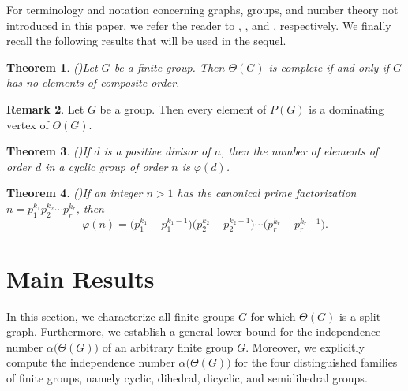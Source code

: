 \documentclass{amsart}
\theoremstyle{plain}
\newtheorem{theorem}{Theorem}[section]
\theoremstyle{definition}
\newtheorem{remark}[theorem]{Remark}
\begin{document}
\vspace{0.5mm}
For terminology and notation concerning graphs, groups, and number theory not introduced in this paper, we refer the reader to \cite{west-b01}, \cite{gallian-b21}, and \cite{burton-b07}, respectively. We finally recall the following results that will be used in the sequel.

\begin{theorem}(\cite[Theorem~3.5]{adhikari-nsjom22})\label{th_thetaG-complete-iff-G-no-compo-order}
Let $G$ be a finite group. Then $\Theta(G)$ is complete if and only if $G$ has no elements of composite order.
\end{theorem}

\begin{remark}\cite[Theorem~3.1(b)]{adhikari-nsjom22}\label{re_dominating-vertex}
Let $G$ be a group. Then every element of $P(G)$ is a dominating vertex of $\Theta(G)$.
\end{remark}

\begin{theorem}(\cite[Theorem~4.4]{gallian-b21})\label{th_phi-d-elems-in-Zn}
If $d$ is a positive divisor of $n$, then the number of elements of order $d$ in a cyclic group of order $n$ is $\varphi(d)$.
\end{theorem}

\begin{theorem}(\cite[Theorem~7.3]{burton-b07})\label{th_value-of-phi-n}
If an integer $n>1$ has the canonical prime factorization $n = p_1^{k_1} p_2^{k_2} \cdots p_r^{k_r}$, then 
\[\varphi(n) = \bigl(p_1^{k_1}-p_1^{k_1-1} \bigr) \bigl(p_2^{k_2}-p_2^{k_2-1}\bigr) \cdots \bigl(p_r^{k_r}-p_r^{k_r-1}\bigr).\] 
\end{theorem}

\section{Main Results}
In this section, we characterize all finite groups $G$ for which $\Theta(G)$ is a split graph. Furthermore, we establish a general lower bound for the independence number $\alpha\bigl(\Theta(G)\bigr)$ of an arbitrary finite group $G$. Moreover, we explicitly compute the independence number $\alpha\bigl(\Theta(G)\bigr)$ for the four distinguished families of finite groups, namely cyclic, dihedral, dicyclic, and semidihedral groups.


\vspace{0.5mm}
\end{document}
